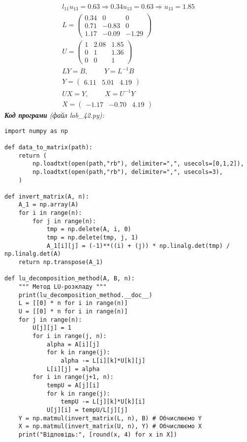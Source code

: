 \documentclass{article}
\newcommand\lab{4}
\begin{document}
\begin{large}
\begin{gather}
		l_{11}u_{13}=0.63 \Rightarrow 0.34u_{13}=0.63 \Rightarrow u_{13}=1.85\\\nonumber
		L=\begin{pmatrix}
			0.34 & 0 & 0\\
			0.71 & -0.83 & 0\\
			1.17 & -0.09 & -1.29
		\end{pmatrix}\\\nonumber
		U=\begin{pmatrix}
			1 & 2.08 & 1.85\\
			0 & 1 & 1.36\\
			0 & 0 & 1
		\end{pmatrix}\\\nonumber
		LY=B,\hspace{28pt}Y=L^{-1}B\\\nonumber
		Y=\begin{pmatrix}
			6.11 & 5.01 & 4.19
		\end{pmatrix}\\\nonumber
		UX=Y,\hspace{28pt}X=U^{-1}Y\\\nonumber
		X=\begin{pmatrix}
			-1.17 & -0.70 & 4.19
		\end{pmatrix}
		\end{gather}
		\noindent\textit{\textbf{Код програми} (файл lab\_\lab2.py):}
		\begin{lstlisting}
import numpy as np

def data_to_matrix(path):
	return (
		np.loadtxt(open(path,"rb"), delimiter=",", usecols=[0,1,2]),
		np.loadtxt(open(path,"rb"), delimiter=",", usecols=3),
	)

def invert_matrix(A, n):
	A_1 = np.array(A)
	for i in range(n):
		for j in range(n):
			tmp = np.delete(A, i, 0)
			tmp = np.delete(tmp, j, 1)
			A_1[i][j] = (-1)**((i) + (j)) * np.linalg.det(tmp) / np.linalg.det(A)
	return np.transpose(A_1)

def lu_decomposition_method(A, B, n):
	""" Метод LU-розкладу """
	print(lu_decomposition_method.__doc__)
	L = [[0] * n for i in range(n)]
	U = [[0] * n for i in range(n)]
	for j in range(n):
		U[j][j] = 1
		for i in range(j, n):
			alpha = A[i][j]
			for k in range(j):
				alpha -= L[i][k]*U[k][j]
			L[i][j] = alpha
		for i in range(j+1, n):
			tempU = A[j][i]
			for k in range(j):
				tempU -= L[j][k]*U[k][i]
			U[j][i] = tempU/L[j][j]
	Y = np.matmul(invert_matrix(L, n), B) # Обчислюємо Y
	X = np.matmul(invert_matrix(U, n), Y) # Обчислюємо X
	print("Відповідь:", [round(x, 4) for x in X])


\end{lstlisting}
\end{large}
\end{document}
